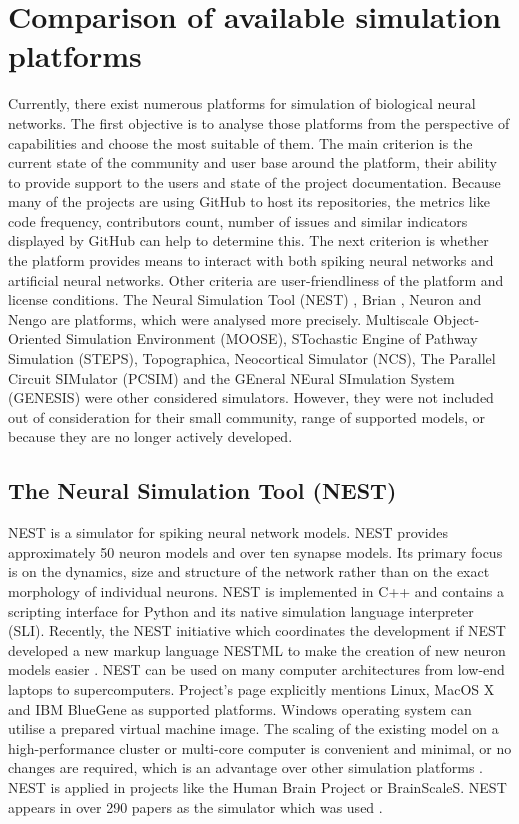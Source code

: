 \chapter{Comparison of available simulation platforms} \label{chap:03}

Currently, there exist numerous platforms for simulation of biological neural networks. The first objective is to analyse those platforms from the perspective of capabilities and choose the most suitable of them. The main criterion is the current state of the community and user base around the platform, their ability to provide support to the users and state of the project documentation. Because many of the projects are using GitHub to host its repositories, the metrics like code frequency, contributors count, number of issues and similar indicators displayed by GitHub can help to determine this. The next criterion is whether the platform provides means to interact with both spiking neural networks and artificial neural networks. Other criteria are user-friendliness of the platform and license conditions. The Neural Simulation Tool (NEST) \cite{jordanNEST182019}, Brian \cite{stimbergBrianIntuitiveEfficient2019}, Neuron \cite{carnevaleNEURONBook06} and Nengo \cite{bekolayNengoPythonTool2014} are platforms, which were analysed more precisely. Multiscale Object-Oriented Simulation Environment (MOOSE), STochastic Engine of Pathway Simulation (STEPS), Topographica, Neocortical Simulator (NCS), The Parallel Circuit SIMulator (PCSIM) and the GEneral NEural SImulation System (GENESIS) were other considered simulators. However, they were not included out of consideration for their small community, range of supported models, or because they are no longer actively developed.

\section{The Neural Simulation Tool (NEST)}

NEST is a simulator for spiking neural network models. NEST provides approximately 50 neuron models and over ten synapse models. Its primary focus is on the dynamics, size and structure of the network rather than on the exact morphology of individual neurons. NEST is implemented in C++ and contains a scripting interface for Python and its native simulation language interpreter (SLI). Recently, the NEST initiative which coordinates the development if NEST developed a new markup language NESTML to make the creation of new neuron models easier \cite{plotnikovNESTMLModelingLanguage2016}.  NEST can be used on many computer architectures from low-end laptops to supercomputers. Project's page explicitly mentions Linux, MacOS X and IBM BlueGene as supported platforms. Windows operating system can utilise a prepared virtual machine image. The scaling of the existing model on a high-performance cluster or multi-core computer is convenient and minimal, or no changes are required, which is an advantage over other simulation platforms \cite{tikidji-hamburyanSoftwareBrainNetwork2017}. NEST is applied in projects like the Human Brain Project or BrainScaleS. NEST appears in over 290 papers as the simulator which was used \cite{julichaachenresearchallianceNESTNeuralSimulation2015}.

